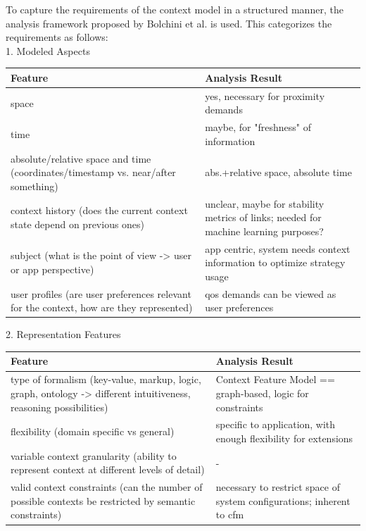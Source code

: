To capture the requirements of the context model in a structured manner, the analysis framework proposed by Bolchini et al. is used. This categorizes the requirements as follows: \\
1. Modeled Aspects \\
\newline
\begin{tabularx}{\textwidth}{|X|X|}
\hline
\textbf{Feature} & \textbf{Analysis Result} \\
\hline 
space & yes, necessary for proximity demands \\ 
\hline 
time & maybe, for "freshness" of information \\ 
\hline 
absolute/relative space and time (coordinates/timestamp vs. near/after something)  & abs.+relative space, absolute time \\ 
\hline 
context history (does the current context state depend on previous ones)  & unclear, maybe for stability metrics of links; needed for machine learning purposes? \\ 
\hline 
subject (what is the point of view -> user or app perspective) & app centric, system needs context information to optimize strategy usage \\ 
\hline 
user profiles (are user preferences relevant for the context, how are they represented) & \gls{qos} demands can be viewed as user preferences \\ 
\hline 
\end{tabularx} 


2. Representation Features \\
\newline
\begin{tabularx}{\textwidth}{|X|X|}
\hline
\textbf{Feature} & \textbf{Analysis Result} \\
\hline 
type of formalism (key-value, markup, logic, graph, ontology -> different intuitiveness, reasoning possibilities)  & Context Feature Model == graph-based, logic for constraints \\ 
\hline 
flexibility (domain specific vs general)  & specific to application, with enough flexibility for extensions \\ 
\hline 
variable context granularity (ability to represent context at different levels of detail) & - \\ 
\hline 
valid context constraints (can the number of possible contexts be restricted by semantic constraints) & necessary to restrict space of system configurations; inherent to \gls{cfm} \\ 
\hline 
\end{tabularx} 
 
